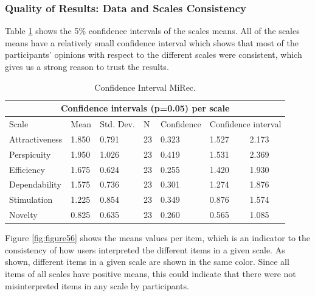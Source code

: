 \subsubsection{Quality of Results: Data and Scales Consistency}
Table \ref{table:table55} shows the 5\% confidence intervals of
the scales means. All of the scales means have a relatively small confidence
interval which shows that most of the participants' opinions with respect to
the different scales were consistent, which gives us a strong reason to trust
the results.\\
\begin{table}[!htbp]
\tiny
\centering
\begin{tabular}{|l|l|l|l|l|l|l|}
\hline
\multicolumn{7}{|c|}{\textbf{Confidence intervals (p=0.05) per scale}}                            \\ \hline
Scale           & Mean   & Std. Dev. & N  & Confidence & \multicolumn{2}{l|}{Confidence interval} \\ \hline
Attractiveness  & 1.850  & 0.791     & 23 & 0.323      & 1.527               & 2.173              \\ \hline
Perspicuity     & 1.950  & 1.026     & 23 & 0.419      & 1.531               & 2.369              \\ \hline
Efficiency      & 1.675  & 0.624     & 23 & 0.255      & 1.420               & 1.930              \\ \hline
Dependability   & 1.575  & 0.736     & 23 & 0.301      & 1.274               & 1.876              \\ \hline
Stimulation     & 1.225  & 0.854     & 23 & 0.349      & 0.876               & 1.574              \\ \hline
Novelty         & 0.825  & 0.635     & 23 & 0.260      & 0.565               & 1.085              \\ \hline
\end{tabular}
\caption{Confidence Interval MiRec.}
\label{table:table55}
\end{table}
Figure \ref{fig:figure56} shows the means values per item, which is an indicator
to the consistency of how users interpreted the different items in a given
scale. As shown, different items in a given scale are shown in the same color.
Since all items of all scales have positive means, this could indicate that
there were not misinterpreted items in any scale by participants.\\

